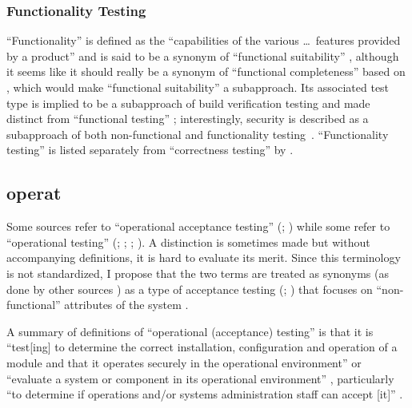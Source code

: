 \subsubsection{Functionality Testing}
``Functionality'' is defined as the
``capabilities of the various \dots\ features provided by a product''
\citep[p.~196]{IEEE2017} and is said to be a synonym of
``functional suitability'' \citepISTQB{}, although it seems
like it should really be a synonym of ``functional completeness'' based on
\citep{ISO_IEC2023a}, which would make ``functional suitability'' a
subapproach. Its associated test type
is implied to be a subapproach of build verification testing
\citepISTQB{} and made distinct from ``functional testing''%
\ifnotpaper; interestingly, security is described as a subapproach of both
non-functional and functionality testing\fi\ \citep[Tab.~2]{Gerrard2000a}.
``Functionality testing'' is listed separately from ``correctness testing'' by
\citet[p.~53]{Firesmith2015}.

\ifnotpaper
    \subsection[Operational (Acceptance) Testing (OAT)]{\acf{operat}}
    \label{oat-discrep}
    Some sources refer to ``operational acceptance testing'' (\citealp[p.~22]{IEEE2022};
    \citealpISTQB{}) while some refer to ``operational testing''
    (\citealp[p.~6-9,~in the context of software engineering operations]{SWEBOK2024};
    \citealp{ISO_IEC2018}; \citealp[p.~303]{IEEE2017};
    \citealp[pp.~4-6,~4-9]{SWEBOK2014}). A distinction is sometimes made
    \citep[p.~30]{Firesmith2015} but without accompanying definitions, it is hard
    to evaluate its merit. Since this terminology is not standardized, I
    propose that the two terms are treated as synonyms (as done by other sources
    \citep{LambdaTest2024, BocchinoAndHamilton1996}) as a type of
    acceptance testing (\citealp[p.~22]{IEEE2022}; \citealpISTQB{}) that focuses on
    ``non-functional'' attributes of the system \citep{LambdaTest2024}%
    .

    A summary of definitions of ``operational (acceptance) testing'' is that
    it is ``test[ing] to determine the correct
    installation, configuration and operation of a module and that it operates
    securely in the operational environment'' \citep{ISO_IEC2018} or ``evaluate a
    system or component in its operational environment'' \citep[p.~303]{IEEE2017},
    particularly ``to determine if operations and/or systems administration staff
    can accept [it]'' \citepISTQB{}.
\fi

